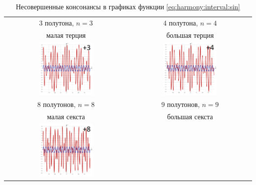 \begin{table}[!ht]
    \caption{Несовершенные консонансы в графиках функции \eqref{eq:harmony:interval:sin}}
    \label{t:harmony:interval:conso-3-4-8-9}
    \centering
    \begin{tabular}{c|c}
        \hline\hline
        3 полутона, $n=3$   & 4 полутона, $n=4$ \\
        малая терция        & большая терция \\
        \includegraphics[width=0.45\textwidth]{fig/intervals/i03}
            & \includegraphics[width=0.45\textwidth]{fig/intervals/i04} \\
        \hline\hline
        8 полутонов, $n=8$  & 9 полутонов, $n=9$ \\
        малая секста        & большая секста \\
        \includegraphics[width=0.45\textwidth]{fig/intervals/i08}

\end{tabular}
\end{table}
